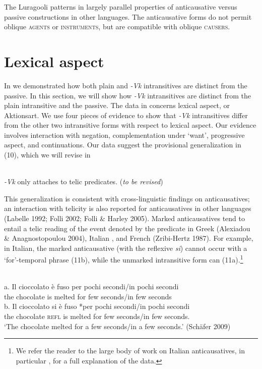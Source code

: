 \documentclass[output=paper]{langsci/langscibook}
\begin{document}
The Luragooli patterns in  largely parallel properties of anticausative versus passive constructions in other languages. The anticausative forms do not permit oblique \textsc{agents} or \textsc{instruments}, but are compatible with oblique \textsc{causers.}

\section{Lexical aspect}

In  we demonstrated how both plain and \textit{-Vk} intransitives are distinct from the passive. In this section, we will show how \textit{-Vk }intransitives are distinct from the plain intransitive and the passive. The data in  concerns lexical aspect, or Aktionsart. We use four pieces of evidence to show that \textit{-Vk} intransitives differ from the other two intransitive forms with respect to lexical aspect. Our evidence involves interaction with negation, complementation under ‘want’, progressive aspect, and continuations. Our data suggest the provisional generalization in (10), which we will revise in 

\ea\label{exx:}
{}\\
 \textit{-Vk }only attaches to telic predicates. (\textit{to be revised})
\z

This generalization is consistent with cross-linguistic findings on anticausatives; an interaction with telicity is also reported for anticausatives in other languages (Labelle 1992; Folli 2002; Folli \& Harley 2005). Marked anticausatives tend to entail a telic reading of the event denoted by the predicate in Greek (Alexiadou \& Anagnostopoulou 2004), Italian \citep{Folli2002}, and French (Zribi-Hertz 1987). For example, in Italian, the marked anticausative (with the reflexive \textit{si}) cannot occur with a ‘for’-temporal phrase (11b), while the unmarked intransitive form can (11a).\footnote{ We refer the reader to the large body of work on Italian anticausatives, in particular \citet{Folli2002}, for a full explanation of the data.}

\ea\label{exx:}
\ea
{}\\
\ex
\gll a.  Il   cioccolato è  fuso     per pochi secondi/in pochi secondi\\
       the chocolate  is melted for few    seconds/in few    seconds\\
\ex       
\gll b.  Il    cioccolato si     è  fuso     *per pochi secondi/in pochi secondi\\
       the chocolate  \textsc{refl} is melted  for   few   seconds/in few seconds. \\
\glt ‘The chocolate melted for a few seconds/in a few seconds.’     (Schäfer 2009)
\z
\z
\end{document}
